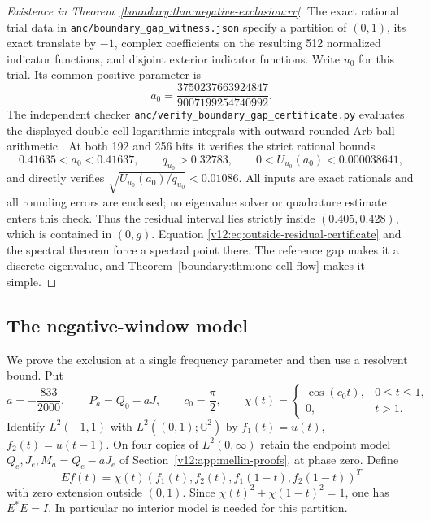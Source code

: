 \begin{proof}[Existence in Theorem~\ref{boundary:thm:negative-exclusion:rr}]
The exact rational trial data in \texttt{anc/boundary\_gap\_witness.json}
specify a partition of $(0,1)$, its exact translate by $-1$, complex
coefficients on the resulting 512 normalized indicator functions,
and disjoint exterior indicator functions. Write $u_0$ for this trial.
Its common positive parameter is
\begin{equation}\label{rr:eq:positive-trial}
 a_0=\frac{3750237663924847}{9007199254740992}.
\end{equation}
The independent checker \texttt{anc/verify\_boundary\_gap\_certificate.py}
evaluates the displayed double-cell logarithmic integrals with
outward-rounded Arb ball arithmetic \cite{Johansson2017}.
At both 192 and 256 bits it verifies
the strict rational bounds
\[
 0.41635<a_0<0.41637,\qquad q_{u_0}>0.32783,\qquad
 0<U_{u_0}(a_0)<0.000038641,
\]
and directly verifies $\sqrt{U_{u_0}(a_0)/q_{u_0}}<0.01086$.
All inputs are exact rationals and all rounding errors are enclosed;
no eigenvalue solver or quadrature estimate enters this check.
Thus the residual interval lies strictly inside $(0.405,0.428)$,
which is contained in $(0,g)$.  Equation
\eqref{v12:eq:outside-residual-certificate} and the spectral theorem
force a spectral point there.  The reference gap makes it a discrete
eigenvalue, and Theorem~\ref{boundary:thm:one-cell-flow} makes it simple.
\end{proof}


\subsection{The negative-window model}

We prove the exclusion at a single frequency parameter and then use a
resolvent bound.  Put
\[
 a=-\frac{833}{2000},\qquad P_a=Q_0-aJ,
 \qquad c_0=\frac\pi2,
 \qquad
 \chi(t)=\begin{cases}\cos(c_0t),&0\le t\le1,\\0,&t>1.\end{cases}
\]
Identify $L^2(-1,1)$ with $L^2((0,1);\mathbb C^2)$ by
$f_1(t)=u(t)$, $f_2(t)=u(t-1)$.  On four copies of $L^2(0,\infty)$
retain the endpoint model $Q_e,J_e,M_a=Q_e-aJ_e$ of
Section~\ref{v12:app:mellin-proofs}, at phase zero.  Define
\[
 Ef(t)=\chi(t)(f_1(t),f_2(t),f_1(1-t),f_2(1-t))^T
\]
with zero extension outside $(0,1)$.  Since
$\chi(t)^2+\chi(1-t)^2=1$, one has $E^*E=I$.  In particular no
interior model is needed for this partition.

